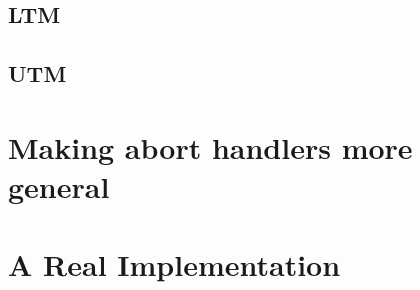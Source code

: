 {\subsection{LTM}

\subsection{UTM}

\section{Making abort handlers more general}



\section{A Real Implementation}

}
